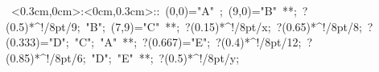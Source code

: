 %

\hbox{
\xy    <0.3cm,0cm>:<0cm,0.3cm>::
       (0,0)="A" ; (9,0)="B" **\dir{-}; ?(0.5)*^!/8pt/{9};
       "B"; (7,9)="C" **\dir{-}; ?(0.15)*^!/8pt/{x};
       ?(0.65)*^!/8pt/{8}; ?(0.333)="D"; "C"; 
       "A" **\dir{-};  ?(0.667)="E"; 
       ?(0.4)*^!/8pt/{12};  ?(0.85)*^!/8pt/{6};
       "D"; "E" **\dir{-}; ?(0.5)*^!/8pt/{y};
       \endxy}
	   
